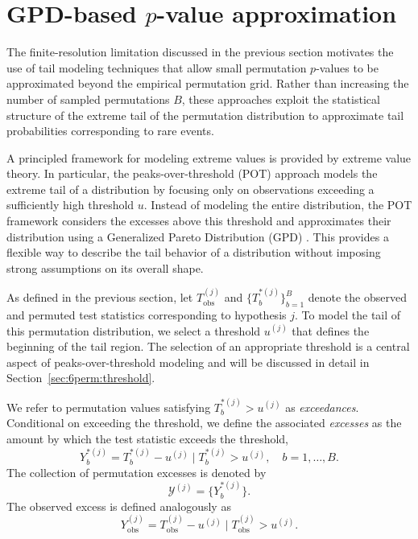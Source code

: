 \section{GPD-based \texorpdfstring{$p$}{p}-value approximation}
\label{sec:6perm:gpd_tail_modeling}

The finite-resolution limitation discussed in the previous section motivates the use of tail modeling techniques that allow small permutation $p$-values to be approximated beyond the empirical permutation grid. Rather than increasing the number of sampled permutations $B$, these approaches exploit the statistical structure of the extreme tail of the permutation distribution to approximate tail probabilities corresponding to rare events.

A principled framework for modeling extreme values is provided by extreme value theory. In particular, the peaks-over-threshold (POT) approach models the extreme tail of a distribution by focusing only on observations exceeding a sufficiently high threshold $u$. Instead of modeling the entire distribution, the POT framework considers the excesses above this threshold and approximates their distribution using a Generalized Pareto Distribution (GPD) \citep{pickands1975statistical,coles2001introduction}. This provides a flexible way to describe the tail behavior of a distribution without imposing strong assumptions on its overall shape.

As defined in the previous section, let $T_{\mathrm{obs}}^{(j)}$ and $\{T_b^{*(j)}\}_{b=1}^{B}$ denote the observed and permuted test statistics corresponding to hypothesis $j$. To model the tail of this permutation distribution, we select a threshold $u^{(j)}$ that defines the beginning of the tail region. The selection of an appropriate threshold is a central aspect of peaks-over-threshold modeling and will be discussed in detail in Section~\ref{sec:6perm:threshold}.

We refer to permutation values satisfying $T_b^{*(j)} > u^{(j)}$ as \emph{exceedances}. Conditional on exceeding the threshold, we define the associated \emph{excesses} as the amount by which the test statistic exceeds the threshold,
\begin{equation}
Y_b^{*(j)} = T_b^{*(j)} - u^{(j)} \;\big|\; T_b^{*(j)} > u^{(j)}, \quad b = 1, \dots, B.
\end{equation}
The collection of permutation excesses is denoted by
\begin{equation}
\mathcal{Y}^{(j)} = \{ Y_b^{*(j)} \}.
\end{equation}
The observed excess is defined analogously as
\begin{equation}
Y_{\mathrm{obs}}^{(j)} = T_{\mathrm{obs}}^{(j)} - u^{(j)} \;\big|\; T_{\mathrm{obs}}^{(j)} > u^{(j)}.
\end{equation}

